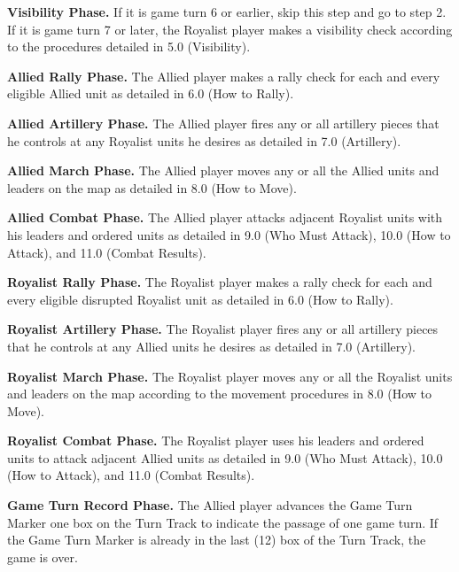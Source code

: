 \begin{steps}
  \item \textbf{Visibility Phase.} If it is game turn 6 or earlier, skip this step and go to step 2. If it is game turn 7 or later, the Royalist player makes a visibility check according to the procedures detailed in 5.0 (Visibility).
  \item \textbf{Allied Rally Phase.} The Allied player makes a rally check for each and every eligible Allied unit as detailed in 6.0 (How to Rally).
  \item \textbf{Allied Artillery Phase.} The Allied player fires any or all artillery pieces that he controls at any Royalist units he desires as detailed in 7.0 (Artillery).
  \item \textbf{Allied March Phase.} The Allied player moves any or all the Allied units and leaders on the map as detailed in 8.0 (How to Move).
  \item \textbf{Allied Combat Phase.} The Allied player attacks adjacent Royalist units with his leaders and ordered units as detailed in 9.0 (Who Must Attack), 10.0 (How to Attack), and 11.0 (Combat Results).
  \item \textbf{Royalist Rally Phase.} The Royalist player makes a rally check for each and every eligible disrupted Royalist unit as detailed in 6.0 (How to Rally).
  \item \textbf{Royalist Artillery Phase.} The Royalist player fires any or all artillery pieces that he controls at any Allied units he desires as detailed in 7.0 (Artillery).
  \item \textbf{Royalist March Phase.} The Royalist player moves any or all the Royalist units and leaders on the map according to the movement procedures in 8.0 (How to Move).
  \item \textbf{Royalist Combat Phase.} The Royalist player uses his leaders and ordered units to attack adjacent Allied units as detailed in 9.0 (Who Must Attack), 10.0 (How to Attack), and 11.0 (Combat Results).
  \item \textbf{Game Turn Record Phase.} The Allied player advances the Game Turn Marker one box on the Turn Track to indicate the passage of one game turn. If the Game Turn Marker is already in the last (12) box of the Turn Track, the game is over.
\end{steps}
